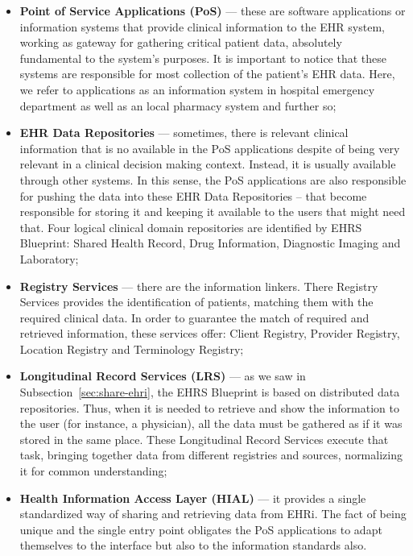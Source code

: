 \begin{itemize}
\item \textbf{Point of Service Applications (PoS)} --- these are software applications or information systems that provide clinical information to the EHR system, working as gateway for gathering critical patient data, absolutely fundamental to the system's purposes. It is important to notice that these systems are responsible for most collection of the patient's EHR data. Here, we refer to applications as an information system in hospital emergency department as well as an local pharmacy system and further so;

\item \textbf{EHR Data Repositories} --- sometimes, there is relevant clinical information that is no available in the PoS applications despite of being very relevant in a clinical decision making context. Instead, it is usually available through other systems. In this sense, the PoS applications are also responsible for pushing the data into these EHR Data Repositories -- that become responsible for storing it and keeping it available to the users that might need that. Four logical clinical domain repositories are identified by EHRS Blueprint: Shared Health Record, Drug Information, Diagnostic Imaging and Laboratory;

\item \textbf{Registry Services} --- there are the information linkers. There Registry Services provides the identification of patients, matching them with the required clinical data. In order to guarantee the match of required and retrieved information, these services offer: Client Registry, Provider Registry, Location Registry and Terminology Registry;

\item \textbf{Longitudinal Record Services (LRS)} --- as we saw in Subsection~\ref{sec:share-ehri}, the EHRS Blueprint is based on distributed data repositories. Thus, when it is needed to retrieve and show the information to the user (for instance, a physician), all the data must be gathered as if it was stored in the same place. These Longitudinal Record Services execute that task, bringing together data from different registries and sources, normalizing it for common understanding;

\item \textbf{Health Information Access Layer (HIAL)} --- it provides a single standardized way of sharing and retrieving data from EHRi. The fact of being unique and the single entry point obligates the PoS applications to adapt themselves to the interface but also to the information standards also. 
\end{itemize}


